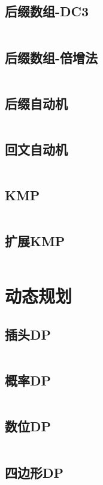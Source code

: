 \documentclass[UTF8]{ctexart}
\begin{document}
\subsection{后缀数组-DC3}
\inputminted{cpp}{string/后缀数组-DC3.cpp}

\subsection{后缀数组-倍增法}
\inputminted{cpp}{string/后缀数组-倍增法.cpp}

\subsection{后缀自动机}
\inputminted{cpp}{string/后缀自动机.cpp}

\subsection{回文自动机}
\inputminted{cpp}{string/回文自动机.cpp}

\subsection{KMP}
\inputminted{cpp}{string/KMP.cpp}

\subsection{扩展KMP}
\inputminted{cpp}{string/扩展KMP.cpp}

\section{动态规划}

\subsection{插头DP}
\inputminted{cpp}{dp/插头dp.cpp}

\subsection{概率DP}
\inputminted{cpp}{dp/概率dp.cpp}

\subsection{数位DP}
\inputminted{cpp}{dp/数位dp.cpp}

\subsection{四边形DP}
\inputminted{cpp}{dp/四边形dp.cpp}
\end{document}

